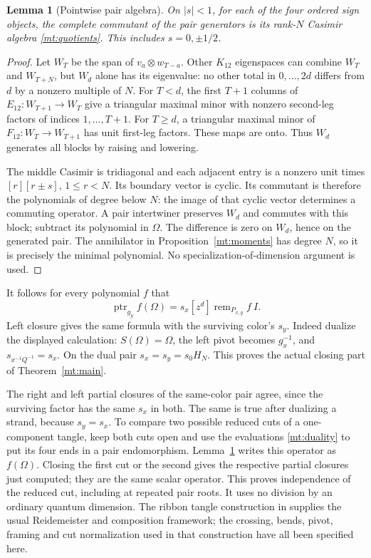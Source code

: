 \documentclass[11pt]{article}
\numberwithin{equation}{section}
\newtheorem{lemma}[theorem]{Lemma}
\theoremstyle{definition}\newtheorem{definition}[theorem]{Definition}
\theoremstyle{remark}\newtheorem{remark}[theorem]{Remark}
\newcommand{\ptr}{\operatorname{ptr}}
\newcommand{\remd}{\operatorname{rem}}
\begin{document}
\begin{lemma}[Pointwise pair algebra]\label{mt:centralizer}
On $|s|<1$, for each of the four ordered sign objects, the complete
commutant of the pair generators is its rank-$N$ Casimir algebra
\eqref{mt:quotients}. This includes $s=0,\pm1/2$.
\end{lemma}
\begin{proof}
Let $W_T$ be the span of $v_a\otimes w_{T-a}$. Other $K_{12}$
eigenspaces can combine $W_T$ and $W_{T+N}$, but $W_d$ alone has
its eigenvalue: no other total in $0,\ldots,2d$ differs from $d$
by a nonzero multiple of $N$. For $T<d$, the first $T+1$ columns
of $E_{12}:W_{T+1}\to W_T$ give a triangular maximal minor with
nonzero second-leg factors of indices $1,\ldots,T+1$. For $T\ge d$,
a triangular maximal minor of $F_{12}:W_T\to W_{T+1}$ has unit
first-leg factors. These maps are onto. Thus $W_d$ generates all
blocks by raising and lowering.

The middle Casimir is tridiagonal and each adjacent entry is a
nonzero unit times $[r][r\pm s]$, $1\le r<N$. Its boundary vector
is cyclic. Its commutant is therefore the polynomials of degree
below $N$: the image of that cyclic vector determines a commuting
operator. A pair intertwiner preserves $W_d$ and commutes with this
block; subtract its polynomial in $\Omega$. The difference is zero
on $W_d$, hence on the generated pair. The annihilator in
Proposition~\ref{mt:moments} has degree $N$, so it is precisely the
minimal polynomial. No specialization-of-dimension argument is used.
\end{proof}

It follows for every polynomial $f$ that
\begin{equation}\label{mt:physical-trace}
 \ptr_{g_y}f(\Omega)=s_x[z^d]\remd_{P_{x,y}}f\ I.
\end{equation}
Left closure gives the same formula with the surviving color's $s_y$.
Indeed dualize the displayed calculation: $S(\Omega)=\Omega$, the
left pivot becomes $g_x^{-1}$, and
$s_{x^{-1}Q^{-1}}=s_x$. On the dual pair $s_x=s_y=s_0H_N$.
This proves the actual closing part of Theorem~\ref{mt:main}.

The right and left partial closures of the same-color pair agree,
since the surviving factor has the same $s_x$ in both. The same is
true after dualizing a strand, because $s_y=s_x$. To compare two
possible reduced cuts of a one-component tangle, keep both cuts open
and use the evaluations \eqref{mt:duality} to put its four ends in a
pair endomorphism. Lemma~\ref{mt:centralizer} writes this operator as
$f(\Omega)$. Closing the first cut or the second gives the respective
partial closures just computed; they are the same scalar operator.
This proves independence of the reduced cut, including at repeated
pair roots. It uses no division by an ordinary quantum dimension.
The ribbon tangle construction in \cite{ADO,GPT} supplies the usual
Reidemeister and composition framework; the crossing, bends, pivot,
framing and cut normalization used in that construction have all been
specified here.
\end{document}

